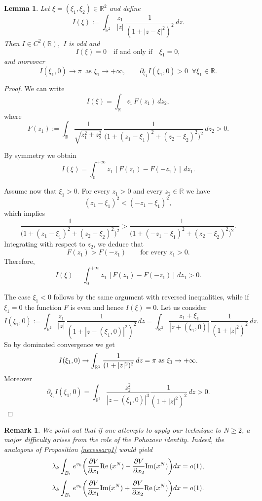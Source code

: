 \documentclass[reqno,11pt]{amsart}
\newtheorem{lemma}[thm]{Lemma}
\newtheorem{rmk}[thm]{Remark}
\theoremstyle{definition}
\numberwithin{equation}{section}
\newcommand{\intr}{\int_{\R^2}}
\newcommand{\R}{\mathbb{R}}
\newcommand{\la}{\lambda}
\renewcommand{\(}{\left(}
\renewcommand{\)}{\right)}
\renewcommand{\[}{\left[}
\renewcommand{\]}{\right]}
\def\Re{{\rm Re}\,}
\def\Im{{\rm Im}}
\begin{document}
{\begin{lemma}\label{signlemma}
Let $\xi=(\xi_1,\xi_2)\in\R^2$ and define
$$
I(\xi):=\int_{\R^2}\frac{z_1}{|z|}\,\frac{1}{(1+|z-\xi|^2)^2}\,dz.
$$
Then $I\in C^2(\R),$ $I$ is odd and 
$$
I(\xi)=0 \quad \text{if and only if} \quad \xi_1=0,
$$
and moreover
$$
I(\xi_1,0)\to \pi  \ \text{ as } \xi_1\to +\infty,
\qquad
\partial_{\xi_1}I(\xi_1,0)>0 \;\;\forall \xi_1\in\R.
$$
\end{lemma}

\begin{proof}
We can write
$$
I(\xi)=\int_{\R} z_1\, F(z_1)\,dz_2,
$$
where
$$
F(z_1):=\int_{\R}
\frac{1}{\sqrt{z_1^2+z_2^2}}\,
\frac{1}{\bigl(1+(z_1-\xi_1)^2+(z_2-\xi_2)^2\bigr)^2}
\,dz_2 >0.
$$

By symmetry  we obtain
$$
I(\xi)=\int_0^{+\infty} z_1\,[F(z_1)-F(-z_1)]\,dz_1.
$$

Assume now that $\xi_1>0$. For every $z_1>0$ and every $z_2\in\R$ we have
$$
(z_1-\xi_1)^2<(-z_1-\xi_1)^2,
$$
which implies
$$
\frac{1}{\bigl(1+(z_1-\xi_1)^2+(z_2-\xi_2)^2\bigr)^2}
>
\frac{1}{\bigl(1+(-z_1-\xi_1)^2+(z_2-\xi_2)^2\bigr)^2}.
$$
Integrating with respect to $z_2$, we deduce that
$$
F(z_1)>F(-z_1)
\qquad \text{for every } z_1>0.
$$
Therefore,
$$
I(\xi)=\int_0^{+\infty} z_1\,[F(z_1)-F(-z_1)]\,dz_1>0.
$$

  The case $\xi_1<0$ follows by the same argument with reversed inequalities,
while if $\xi_1=0$ the function $F$ is even and hence $I(\xi)=0$.
Let us consider
$$
I(\xi_1,0):=\int_{\R^2}\frac{z_1}{|z|}\,\frac{1}{(1+|z-(\xi_1,0)|^2)^2}\,dz=\int_{\R^2}\frac{z_1+\xi_1}{|z+(\xi_1,0)|}\,\frac{1}{(1+|z|^2)^2}\,dz .
$$ So by dominated convergence we get $$I(\xi_1,0)\to \intr \frac{1}{(1+|z|^2)^2}\,dz=\pi \hbox{ as }\xi_1\to +\infty.$$ Moreover 
$$\partial_{\xi_1} I(\xi_1,0)= \intr\frac{z_2^2}{|z-(\xi_1,0)|^3}\frac{1}{(1+|z|^2)^2}\,dz>0.$$
\end{proof}





 \begin{rmk}\label{fails} We point out that if one attempts to apply our technique to $N\geq 2$, a major difficulty arises
from the role of the Pohozaev identity. Indeed, the analogous of Proposition \ref{necessary1} would yield
$$\la_k\int_{B_1}  e^{v_k}\bigg(\frac{\partial V}{\partial x_1}\Re(x^N)-\frac{\partial V}{\partial x_2}\Im(x^N)\bigg) dx=o(1),$$
$$\la_k\int_{B_1}  e^{v_k}\bigg(\frac{\partial V}{\partial x_1}\Im(x^N)+\frac{\partial V}{\partial x_2}\Re(x^N)\bigg) dx=o(1).$$


\end{rmk}}
\end{document}
